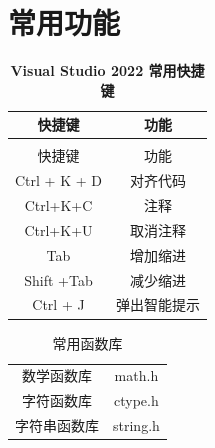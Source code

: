 \documentclass[zihao=-4,UTF8]{report}
\begin{document}
\section{常用功能}
\begin{longtable}[H]{cc}
    \caption{\textbf{Visual Studio 2022 常用快捷键}}\\
    \toprule
    快捷键 & 功能\\
    \midrule
    \endfirsthead
    \bottomrule
    \endfoot

    \toprule
    \multicolumn{2}{c}{\textbf{续上表}}\\
    \midrule
    快捷键 & 功能\\
    \midrule
    \endhead
    \bottomrule
    \endlastfoot
    Ctrl + K + D & 对齐代码\\
    Ctrl+K+C & 注释\\
    Ctrl+K+U & 取消注释\\
    Tab & 增加缩进\\
    Shift +Tab & 减少缩进\\
    Ctrl + J & 弹出智能提示\\
 \end{longtable}

 \begin{table}[H]
    \centering
    \caption{常用函数库}
    \begin{tabular}{cc} 
    \toprule
    数学函数库  & math.h     \\
    字符函数库  & ctype.h    \\
    字符串函数库 & string.h  \\
    \bottomrule
    \end{tabular}
\end{table}
\end{document}
